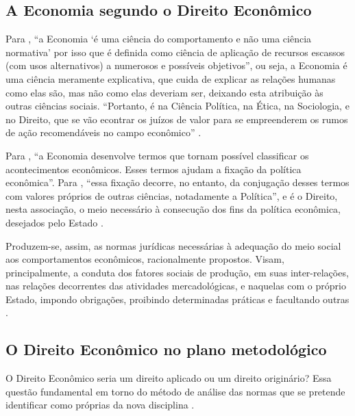 \documentclass[
	10pt,				%
	openright,			%
	twoside,			%
	a5paper,			%
	english,			%
	french,				%
	spanish,			%
	brazil				%
	]{abntex2}
\renewenvironment{quote}
  {\small\list{}{\rightmargin=0.1cm \leftmargin=4cm}%
   \item\relax}
  {\endlist}
\begin{document}
\subsection{A Economia segundo o Direito
Econômico}\label{a-economia-segundo-o-direito-econuxf4mico}

Para , ``a Economia `é uma
ciência do comportamento e não uma ciência normativa' por isso que é
definida como ciência de aplicação de recursos escassos (com usos
alternativos) a numerosos e possíveis objetivos'', ou seja, a Economia é
uma ciência meramente explicativa, que cuida de explicar as relações
humanas como elas são, mas não como elas deveriam ser, deixando esta
atribuição às outras ciências sociais. ``Portanto, é na Ciência
Política, na Ética, na Sociologia, e no Direito, que se vão econtrar os
juízos de valor para se empreenderem os rumos de ação recomendáveis no
campo econômico'' \cite[p.~48]{carvalhosa1973}.

Para , ``a Economia desenvolve
termos que tornam possível classificar os acontecimentos econômicos.
Esses termos ajudam a fixação da política econômica''. Para
, ``essa fixação decorre, no
entanto, da conjugação desses termos com valores próprios de outras
ciências, notadamente a Política'', e é o Direito, nesta associação, o
meio necessário à consecução dos fins da política econômica, desejados
pelo Estado \cite[p.~49]{carvalhosa1973}.

\begin{quote}
Produzem-se, assim, as normas jurídicas necessárias à adequação do meio
social aos comportamentos econômicos, racionalmente propostos. Visam,
principalmente, a conduta dos fatores sociais de produção, em suas
inter-relações, nas relações decorrentes das atividades mercadológicas,
e naquelas com o próprio Estado, impondo obrigações, proibindo
determinadas práticas e facultando outras \cite[p.~49]{carvalhosa1973}.
\end{quote}

\subsection{O Direito Econômico no plano
metodológico}\label{o-direito-econuxf4mico-no-plano-metodoluxf3gico}

O Direito Econômico seria um direito aplicado ou um direito originário?
Essa questão fundamental em torno do método de análise das normas que se
pretende identificar como próprias da nova disciplina .
\end{document}
